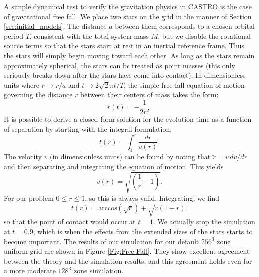 \documentclass{emulateapj}
\begin{document}
A simple dynamical test to verify the gravitation physics in CASTRO is
the case of gravitational free fall. We place two stars on the grid 
in the manner of Section \ref{sec:initial_models}. The distance $a$ between 
them corresponds to a chosen orbital period $T$, consistent with the total
system mass $M$, but we disable the rotational source terms so that 
the stars start at rest in an inertial reference frame. 
Thus the stars will simply begin moving toward each other.
As long as the stars remain approximately spherical, the stars can be 
treated as point masses (this only seriously breaks down after the stars
have come into contact). In dimensionless units where $r \to r / a$ and 
$t \to 2\sqrt{2}\pi t / T$, the simple free fall equation of motion governing the
distance $r$ between their centers of mass takes the form:
\begin{equation}
  \ddot{r}(t) = - \frac{1}{2r^2}.
\end{equation}
It is possible to derive a closed-form solution for the evolution time
as a function of separation by starting with the integral formulation,
\begin{equation}
  t(r) = \int_{1}^{r} \frac{dr}{v(r)}.
\end{equation}
The velocity $v$ (in dimensionless units) can be found by noting that 
$\ddot{r} = v\, dv / dr$ and then separating and integrating the equation 
of motion. This yields 
\begin{equation}
  v(r) = \sqrt{\left(\frac{1}{r} - 1\right)}.
\end{equation}
For our problem $0 \leq r \leq 1$, so this is always valid. Integrating, we find
\begin{equation}
  t(r) = \text{arccos}\left(\sqrt{r}\right) + \sqrt{r \left(1 - r\right)}. \label{analyticalFreeFall}
\end{equation}
so that the point of contact would occur at $t = 1$. We actually stop the simulation
at $t = 0.9$, which is when the effects from the extended sizes of the stars
starts to become important. The results of our simulation for our default $256^3$ zone 
uniform grid are shown in Figure \ref{Fig:Free Fall}. They show excellent agreement
between the theory and the simulation results, and this agreement holds even for 
a more moderate $128^3$ zone simulation.
\end{document}
